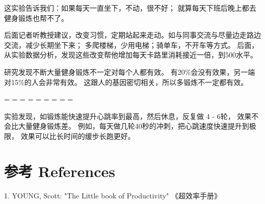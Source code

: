 这实验告诉我们：如果每天一直坐下，不动，很不好；
就算每天下班后晚上都去健身锻炼也帮不了。

后面记者听教授建议，改变习惯，定期站起来走动。如与同事交流与尽量边走路边交流，减少长期坐下来；
多爬楼梯，少用电梯；骑单车，不开车等方式。
后面，从实验数据分析，发现这些改变帮他增加每天卡路里消耗接近一倍，到500水平。

研究发现不断大量健身锻炼不一定对每个人都有效。
有20\%会没有效果，另一端对15\%的人会非常有效。
这跟人的基因密切相关，所以多锻炼不一定都有效。

\begin{description}
\tightlist
\item[]
= = = = = = = = =
\end{description}

实验发现，如锻炼能快速提升心跳率到最高，然后休息，反复做 4 - 6轮，
效果不会比大量健身锻炼差。
例如，每天做几轮40秒的冲刺，把心跳速度快速提升到极限，
效果可以比长时间的缓步长跑更好。


\hypertarget{ux53c2ux8003-references}{%
\section{参考 References}\label{ux53c2ux8003-references}}

1. YOUNG, Scott: "The Little book of Productivity" 《超效率手册》\\



